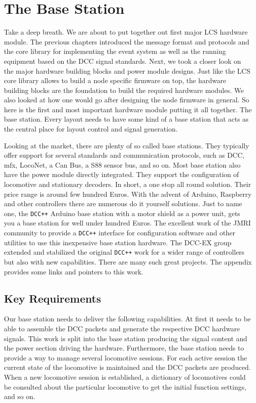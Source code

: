 \chapter{The Base Station}

Take a deep breath. We are about to put together out first major LCS hardware module. The previous chapters introduced the message format and protocols and the core library for implementing the event system as well as the running equipment based on the DCC signal standards. Next, we took a closer look on the major hardware building blocks and power module designs. Just like the LCS core library allows to build a node specific firmware on top, the hardware building blocks are the foundation to build the required hardware modules. We also looked at how one would go after designing the node firmware in general. So here is the first and most important hardware module putting it all together. The base station. Every layout needs to have some kind of a base station that acts as the central place for layout control and signal generation.

Looking at the market, there are plenty of so called base stations. They typically offer support for several standards and communication protocols, such as DCC, mfx, LocoNet, a Can Bus, a S88 sensor bus, and so on. Most base station also have the power module directly integrated. They support the configuration of locomotive and stationary decoders. In short, a one stop all round solution. Their price range is around few hundred Euros. With the advent of Arduino, Raspberry and other controllers there are numerous do it yourself solutions. Just to name one, the \texttt{DCC++} Arduino base station with a motor shield as a power unit, gets you a base station for well under hundred Euros. The excellent work of the JMRI community to provide a \texttt{DCC++} interface for configuration software and other utilities to use this inexpensive base station hardware. The DCC-EX group extended and stabilized the original \texttt{DCC++} work for a wider range of controllers but also with new capabilities. There are many such great projects. The appendix provides some links and pointers to this work.

\section{Key Requirements}

Our base station needs to deliver the following capabilities. At first it needs to be able to assemble the DCC packets and generate the respective DCC hardware signals. This work is split into the base station producing the signal content and the power section driving the hardware. Furthermore, the base station needs to provide a way to manage several locomotive sessions. For each active session the current state of the locomotive is maintained and the DCC packets are produced. When a new locomotive session is established, a dictionary of locomotives could be consulted about the particular locomotive to get the initial function settings, and so on.


